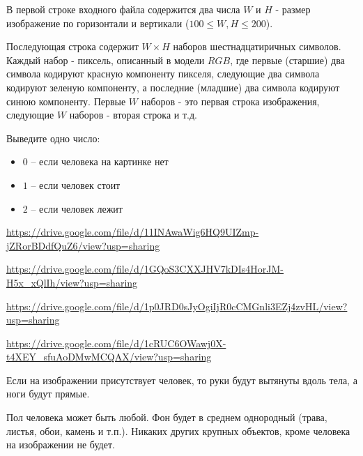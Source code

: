 В первой строке входного файла содержится два числа $W$ и $H$ - размер изображение по горизонтали и вертикали ($100 \le W, H \le 200$).

Последующая строка содержит $W \times H$ наборов шестнадцатиричных символов. Каждый набор - пиксель, описанный в модели $RGB$, где первые (старшие) два символа кодируют красную компоненту пикселя, следующие два символа кодируют зеленую компоненту, а последние (младшие) два символа кодируют синюю компоненту.
Первые $W$ наборов - это первая строка изображения, следующие $W$ наборов - вторая строка и т.д.

\outputfmtSection

Выведите одно число:
\begin{itemize}
  \item $0$ -- если человека на картинке нет
  \item $1$ -- если человек стоит
  \item $2$ -- если человек лежит
\end{itemize}

\exampleSection

\url{https://drive.google.com/file/d/11INAwaWig6HQ9UIZmp-jZRorBDdfQuZ6/view?usp=sharing}

\url{https://drive.google.com/file/d/1GQoS3CXXJHV7kDIs4HorJM-H5x_xQlIh/view?usp=sharing}

\url{https://drive.google.com/file/d/1p0JRD0sJyOgiIjR0cCMGnli3EZj4zvHL/view?usp=sharing}

\url{https://drive.google.com/file/d/1cRUC6OWawj0X-t4XEY_sfuAoDMwMCQAX/view?usp=sharing}

\commentsSection

Если на изображении присутствует человек, то руки будут вытянуты вдоль тела, а ноги будут прямые.

Пол человека может быть любой.
Фон будет в среднем однородный (трава, листья, обои, камень и т.п.). Никаких других крупных объектов, кроме человека на изображении не будет.

